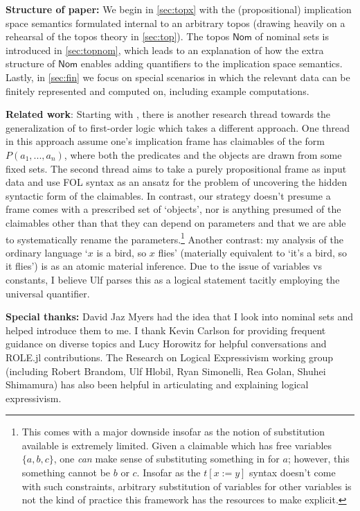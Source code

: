 \documentclass{article}
\theoremstyle{definition}
\newcommand{\cat}[1]{\mathsf{#1}}
\begin{document}
{\bf Structure of paper:} We begin in \cref{sec:topx} with the (propositional) implication space semantics formulated internal to an arbitrary topos (drawing heavily on a rehearsal of the topos theory in \cref{sec:top}). The topos $\cat{Nom}$ of nominal sets is introduced in \cref{sec:topnom}, which leads to an explanation of how the extra structure of $\cat{Nom}$ enables adding quantifiers to the implication space semantics. Lastly, in \cref{sec:fin} we focus on special scenarios in which the relevant data can be finitely represented and computed on, including example computations.


{\bf Related work}: Starting with \cite{hlobil2026first}, there is another research thread towards the generalization of \cite{hlobil2025reasons} to first-order logic which takes a different approach. One thread in this approach assume one's implication frame has claimables of the form $P(a_1,...,a_n)$, where both the predicates and the objects are drawn from some fixed sets. The second thread aims to take a purely propositional frame as input data and use FOL syntax as an ansatz for the problem of uncovering the hidden syntactic form of the claimables. 
In contrast, our strategy doesn't presume a frame comes with a prescribed set of `objects', nor is anything presumed of the claimables other than that they can depend on parameters and that we are able to systematically rename the parameters.\footnote{This comes with a major downside insofar as the notion of substitution available is extremely limited. Given a claimable which has free variables $\{a,b,c\}$, one {\it can} make sense of substituting something in for $a$; however, this something cannot be $b$ or $c$. Insofar as the $t[x:=y]$ syntax doesn't come with such constraints, arbitrary substitution of variables for other variables is not the kind of practice this framework has the resources to make explicit.} 
Another contrast: my analysis of the ordinary language `$x$ is a bird, so $x$ flies' (materially equivalent to `it's a bird, so it flies') is as an atomic material inference. Due to the issue of variables vs constants, I believe Ulf parses this as a logical statement tacitly employing the universal quantifier.


{\bf Special thanks:}  David Jaz Myers had the idea that I look into nominal sets and helped introduce them to me. I thank Kevin Carlson for providing frequent guidance on diverse topics and Lucy Horowitz for helpful conversations and ROLE.jl contributions. 
The Research on Logical Expressivism working group (including Robert Brandom, Ulf Hlobil, Ryan Simonelli, Rea Golan, Shuhei Shimamura) has also been helpful in articulating and explaining logical expressivism.
\end{document}
